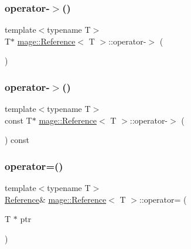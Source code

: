 \hypertarget{classmage_1_1_reference_a70e8990c4f4d879692fc2cd28cb6dd88}{}\label{classmage_1_1_reference_a70e8990c4f4d879692fc2cd28cb6dd88} 
\subsubsection{\texorpdfstring{operator-\/$>$()}{operator->()}\hspace{0.1cm}{\footnotesize\ttfamily [1/2]}}
{\footnotesize\ttfamily template$<$typename T$>$ \\
T$\ast$ \hyperlink{classmage_1_1_reference}{mage\+::\+Reference}$<$ T $>$\+::operator-\/$>$ (\begin{DoxyParamCaption}{ }\end{DoxyParamCaption})}

\hypertarget{classmage_1_1_reference_ab0f3ae3e1c9f71c211db4b1ec6dcca83}{}\label{classmage_1_1_reference_ab0f3ae3e1c9f71c211db4b1ec6dcca83} 
\subsubsection{\texorpdfstring{operator-\/$>$()}{operator->()}\hspace{0.1cm}{\footnotesize\ttfamily [2/2]}}
{\footnotesize\ttfamily template$<$typename T$>$ \\
const T$\ast$ \hyperlink{classmage_1_1_reference}{mage\+::\+Reference}$<$ T $>$\+::operator-\/$>$ (\begin{DoxyParamCaption}{ }\end{DoxyParamCaption}) const}

\hypertarget{classmage_1_1_reference_abf1457f709eefcc56e23ad6f127cd9a4}{}\label{classmage_1_1_reference_abf1457f709eefcc56e23ad6f127cd9a4} 
\subsubsection{\texorpdfstring{operator=()}{operator=()}\hspace{0.1cm}{\footnotesize\ttfamily [1/2]}}
{\footnotesize\ttfamily template$<$typename T$>$ \\
\hyperlink{classmage_1_1_reference}{Reference}\& \hyperlink{classmage_1_1_reference}{mage\+::\+Reference}$<$ T $>$\+::operator= (\begin{DoxyParamCaption}\item[{T $\ast$}]{ptr }\end{DoxyParamCaption})}

